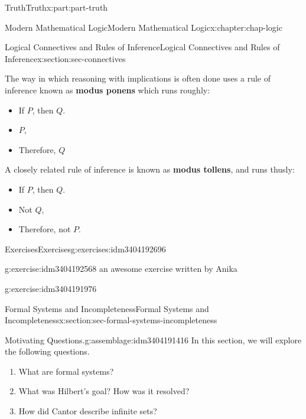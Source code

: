 \documentclass[oneside,10pt,]{book}
\newcommand{\terminology}[1]{\textbf{#1}}
\numberwithin{equation}{section}
\begin{document}
\begin{partptx}{Truth}{}{Truth}{}{}{x:part:part-truth}
\begin{chapterptx}{Modern Mathematical Logic}{}{Modern Mathematical Logic}{}{}{x:chapter:chap-logic}
\begin{sectionptx}{Logical Connectives and Rules of Inference}{}{Logical Connectives and Rules of Inference}{}{}{x:section:sec-connectives}
\par
The way in which reasoning with implications is often done uses a rule of inference known as \terminology{modus ponens} which runs roughly:%
%
\begin{itemize}[label=\textbullet]
\item{}If \(P\), then \(Q\).%
\item{}\(P\),%
\item{}Therefore, \(Q\)%
\end{itemize}
A closely related rule of inference is known as \terminology{modus tollens}, and runs thusly:%
%
\begin{itemize}[label=\textbullet]
\item{}If \(P\), then \(Q\).%
\item{}Not \(Q\),%
\item{}Therefore, not \(P\).%
\end{itemize}
%
%
\typeout{************************************************}
\typeout{************************************************}
%
\begin{exercises-subsection-numberless}{Exercises}{}{Exercises}{}{}{g:exercises:idm3404192696}
\begin{divisionexercise}{1}{}{}{g:exercise:idm3404192568}%
an awesome exercise written by Anika%
\end{divisionexercise}%
\begin{divisionexercise}{2}{}{}{g:exercise:idm3404191976}%
\end{divisionexercise}%
\end{exercises-subsection-numberless}
\end{sectionptx}
%
%
\typeout{************************************************}
\typeout{************************************************}
%
\begin{sectionptx}{Formal Systems and Incompleteness}{}{Formal Systems and Incompleteness}{}{}{x:section:sec-formal-systems-incompleteness}
\begin{assemblage}{Motivating Questions.}{g:assemblage:idm3404191416}%
In this section, we will explore the following questions. %
\begin{enumerate}
\item{}What are formal systems?%
\item{}What was Hilbert's goal? How was it resolved?%
\item{}How did Cantor describe infinite sets?%
\end{enumerate}

\end{assemblage}
\end{sectionptx}
\end{chapterptx}
\end{partptx}
\end{document}
